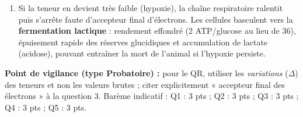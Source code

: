 \documentclass[11pt]{article}
\begin{document}
\begin{corrige}
\begin{enumerate}
\item Si la teneur en  devient très faible (hypoxie), la chaîne respiratoire ralentit puis s'arrête faute d'accepteur final d'électrons. Les cellules basculent vers la \textbf{fermentation lactique} : rendement effondré (2 ATP/glucose au lieu de 36), épuisement rapide des réserves glucidiques et accumulation de lactate (acidose), pouvant entraîner la mort de l'animal si l'hypoxie persiste.
\end{enumerate}
\textbf{Point de vigilance (type Probatoire) :} pour le QR, utiliser les \emph{variations} ($\Delta$) des teneurs et non les valeurs brutes ; citer explicitement « accepteur final des électrons » à la question 3. Barème indicatif : Q1 : 3 pts ; Q2 : 3 pts ; Q3 : 3 pts ; Q4 : 3 pts ; Q5 : 3 pts.
\end{corrige}
\end{document}
